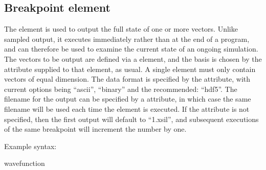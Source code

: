 \documentclass[letterpaper,10pt,english]{sphinxmanual}
\begin{document}
\subsection{Breakpoint element}
\label{\detokenize{reference_elements:breakpoint-element}}\label{\detokenize{reference_elements:breakpointelement}}\label{\detokenize{reference_elements:index-87}}
\sphinxAtStartPar
The  element is used to output the full state of one or more vectors.  Unlike sampled output, it executes immediately rather than at the end of a program, and can therefore be used to examine the current state of an ongoing simulation.  The vectors to be output are defined via a {\hyperref[\detokenize{reference_elements:dependencies}]{}} element, and the basis is chosen by the  attribute supplied to that  element, as usual.  A single  element must only contain vectors of equal dimension.  The data format is specified by the  attribute, with current options being “ascii”, “binary” and the recommended: “hdf5”.  The filename for the output can be specified by a  attribute, in which case the same filename will be used each time the element is executed.  If the  attribute is not specified, then the first output will default to “1.xsil”, and subsequent executions of the same breakpoint will increment the number by one.

\sphinxAtStartPar
Example syntax:

\begin{sphinxVerbatim}[commandchars=\\\{\}]
  
   wavefunction
\end{sphinxVerbatim}

\ignorespaces 
\end{document}
